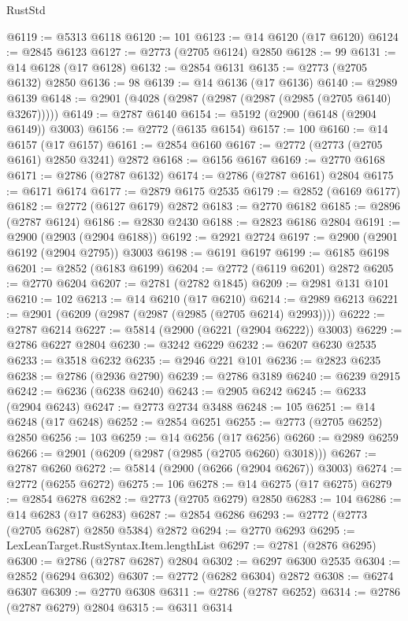 \begin{lexlean}{RustStd}
\begin{coremodule}
@6119 := @5313 @6118
@6120 := 101
@6123 := @14 @6120 (@17 @6120)
@6124 := @2845 @6123
@6127 := @2773 (@2705 @6124) @2850
@6128 := 99
@6131 := @14 @6128 (@17 @6128)
@6132 := @2854 @6131
@6135 := @2773 (@2705 @6132) @2850
@6136 := 98
@6139 := @14 @6136 (@17 @6136)
@6140 := @2989 @6139
@6148 := @2901 (@4028 (@2987 (@2987 (@2987 (@2985 (@2705 @6140) @3267)))))
@6149 := @2787 @6140
@6154 := @5192 (@2900 (@6148 (@2904 @6149)) @3003)
@6156 := @2772 (@6135 @6154)
@6157 := 100
@6160 := @14 @6157 (@17 @6157)
@6161 := @2854 @6160
@6167 := @2772 (@2773 (@2705 @6161) @2850 @3241) @2872
@6168 := @6156 @6167
@6169 := @2770 @6168
@6171 := @2786 (@2787 @6132)
@6174 := @2786 (@2787 @6161) @2804
@6175 := @6171 @6174
@6177 := @2879 @6175 @2535
@6179 := @2852 (@6169 @6177)
@6182 := @2772 (@6127 @6179) @2872
@6183 := @2770 @6182
@6185 := @2896 (@2787 @6124)
@6186 := @2830 @2430
@6188 := @2823 @6186 @2804
@6191 := @2900 (@2903 (@2904 @6188))
@6192 := @2921 @2724
@6197 := @2900 (@2901 @6192 (@2904 @2795)) @3003
@6198 := @6191 @6197
@6199 := @6185 @6198
@6201 := @2852 (@6183 @6199)
@6204 := @2772 (@6119 @6201) @2872
@6205 := @2770 @6204
@6207 := @2781 (@2782 @1845)
@6209 := @2981 @131 @101
@6210 := 102
@6213 := @14 @6210 (@17 @6210)
@6214 := @2989 @6213
@6221 := @2901 (@6209 (@2987 (@2987 (@2985 (@2705 @6214) @2993))))
@6222 := @2787 @6214
@6227 := @5814 (@2900 (@6221 (@2904 @6222)) @3003)
@6229 := @2786 @6227 @2804
@6230 := @3242 @6229
@6232 := @6207 @6230 @2535
@6233 := @3518 @6232
@6235 := @2946 @221 @101
@6236 := @2823 @6235
@6238 := @2786 (@2936 @2790)
@6239 := @2786 @3189
@6240 := @6239 @2915
@6242 := @6236 (@6238 @6240)
@6243 := @2905 @6242
@6245 := @6233 (@2904 @6243)
@6247 := @2773 @2734 @3488
@6248 := 105
@6251 := @14 @6248 (@17 @6248)
@6252 := @2854 @6251
@6255 := @2773 (@2705 @6252) @2850
@6256 := 103
@6259 := @14 @6256 (@17 @6256)
@6260 := @2989 @6259
@6266 := @2901 (@6209 (@2987 (@2985 (@2705 @6260) @3018)))
@6267 := @2787 @6260
@6272 := @5814 (@2900 (@6266 (@2904 @6267)) @3003)
@6274 := @2772 (@6255 @6272)
@6275 := 106
@6278 := @14 @6275 (@17 @6275)
@6279 := @2854 @6278
@6282 := @2773 (@2705 @6279) @2850
@6283 := 104
@6286 := @14 @6283 (@17 @6283)
@6287 := @2854 @6286
@6293 := @2772 (@2773 (@2705 @6287) @2850 @5384) @2872
@6294 := @2770 @6293
@6295 := LexLeanTarget.RustSyntax.Item.lengthList
@6297 := @2781 (@2876 @6295)
@6300 := @2786 (@2787 @6287) @2804
@6302 := @6297 @6300 @2535
@6304 := @2852 (@6294 @6302)
@6307 := @2772 (@6282 @6304) @2872
@6308 := @6274 @6307
@6309 := @2770 @6308
@6311 := @2786 (@2787 @6252)
@6314 := @2786 (@2787 @6279) @2804
@6315 := @6311 @6314

\end{coremodule}
\end{lexlean}
